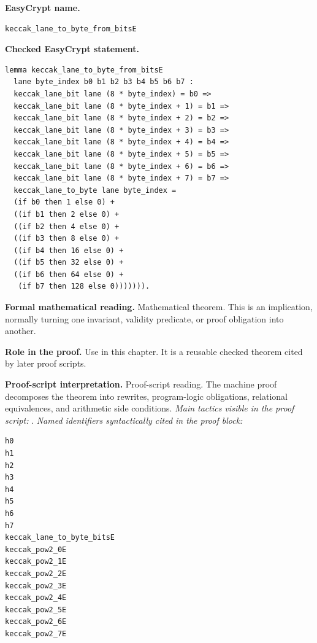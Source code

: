 \begin{formaltheorem}
\noindent\textbf{EasyCrypt name.}
\begin{lstlisting}[language=EasyCrypt,basicstyle=\ttfamily\scriptsize]
keccak_lane_to_byte_from_bitsE
\end{lstlisting}
\noindent\textbf{Checked EasyCrypt statement.}
\begin{lstlisting}[language=EasyCrypt,basicstyle=\ttfamily\scriptsize]
lemma keccak_lane_to_byte_from_bitsE
  lane byte_index b0 b1 b2 b3 b4 b5 b6 b7 :
  keccak_lane_bit lane (8 * byte_index) = b0 =>
  keccak_lane_bit lane (8 * byte_index + 1) = b1 =>
  keccak_lane_bit lane (8 * byte_index + 2) = b2 =>
  keccak_lane_bit lane (8 * byte_index + 3) = b3 =>
  keccak_lane_bit lane (8 * byte_index + 4) = b4 =>
  keccak_lane_bit lane (8 * byte_index + 5) = b5 =>
  keccak_lane_bit lane (8 * byte_index + 6) = b6 =>
  keccak_lane_bit lane (8 * byte_index + 7) = b7 =>
  keccak_lane_to_byte lane byte_index =
  (if b0 then 1 else 0) +
  ((if b1 then 2 else 0) +
  ((if b2 then 4 else 0) +
  ((if b3 then 8 else 0) +
  ((if b4 then 16 else 0) +
  ((if b5 then 32 else 0) +
  ((if b6 then 64 else 0) +
   (if b7 then 128 else 0))))))).
\end{lstlisting}
\noindent\textbf{Formal mathematical reading.}
Mathematical theorem. This is an implication, normally turning one invariant, validity predicate, or proof obligation into another.

\noindent\textbf{Role in the proof.}
Use in this chapter. It is a reusable checked theorem cited by later proof scripts.

\noindent\textbf{Proof-script interpretation.}
Proof-script reading. The machine proof decomposes the theorem into rewrites, program-logic obligations, relational equivalences, and arithmetic side conditions.
\emph{Main tactics visible in the proof script:} .
\emph{Named identifiers syntactically cited in the proof block:}
\begin{lstlisting}[language=EasyCrypt,basicstyle=\ttfamily\scriptsize]
h0
h1
h2
h3
h4
h5
h6
h7
keccak_lane_to_byte_bitsE
keccak_pow2_0E
keccak_pow2_1E
keccak_pow2_2E
keccak_pow2_3E
keccak_pow2_4E
keccak_pow2_5E
keccak_pow2_6E
keccak_pow2_7E
\end{lstlisting}

\end{formaltheorem}

